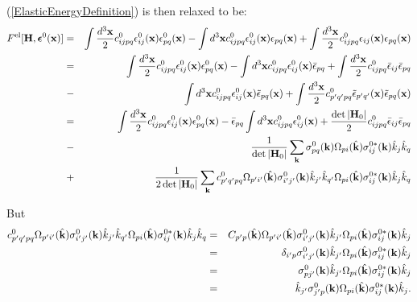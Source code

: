\documentclass[12pt]{article}
\def\bmath#1{\mbox{\boldmath$#1$}}
\begin{document}
(\ref{ElasticEnergyDefinition}) is then relaxed to be:
\begin{eqnarray}
F^{\rm el}[{\bf H}, \bmath{\epsilon}^0({\bf x})] =&& 
 \int \frac{d^3{\bf x}}{2} c^0_{ijpq}
 \epsilon^0_{ij}({\bf x})  
 \epsilon^0_{pq}({\bf x}) - 
\int d^3{\bf x} c^0_{ijpq} \epsilon^0_{ij}({\bf x}) {\epsilon}_{pq}({\bf x})
+ 
\int \frac{d^3{\bf x}}{2} c^0_{ijpq} 
{\epsilon}_{ij}({\bf x}){\epsilon}_{pq}({\bf x})
 \nonumber\\
=&& 
 \int \frac{d^3{\bf x}}{2} c^0_{ijpq}
 \epsilon^0_{ij}({\bf x})  
 \epsilon^0_{pq}({\bf x}) - 
\int d^3{\bf x} c^0_{ijpq} \epsilon^0_{ij}({\bf x}) \bar{\epsilon}_{pq}
+ 
\int \frac{d^3{\bf x}}{2} c^0_{ijpq} \bar{\epsilon}_{ij} \bar{\epsilon}_{pq}
 \nonumber\\
-&& \int d^3{\bf x} c^0_{ijpq} \epsilon^0_{ij}({\bf x})
  \tilde{\epsilon}_{pq}({\bf x}) + 
\int \frac{d^3{\bf x}}{2} c^0_{p'q'pq} \tilde{\epsilon}_{p'q'}({\bf x}) 
\tilde{\epsilon}_{pq}({\bf x}) 
\nonumber\\
=&& 
 \int \frac{d^3{\bf x}}{2} c^0_{ijpq}
 \epsilon^0_{ij}({\bf x})  
 \epsilon^0_{pq}({\bf x}) - 
\bar{\epsilon}_{pq}\int d^3{\bf x} c^0_{ijpq} \epsilon^0_{ij}({\bf x}) 
+ 
\frac{\det|{\bf H}_0|}{2} c^0_{ijpq} \bar{\epsilon}_{ij} \bar{\epsilon}_{pq}
 \nonumber\\
-&& \frac{1}{\det|{\bf H}_0|}\sum_{\bf k}
\sigma^0_{pq}({\bf k})
\Omega_{pi}(\hat{\bf k})\sigma^{0*}_{ij}({\bf k}) \hat{k}_j \hat{k}_q
 \nonumber\\
 +&&
\frac{1}{2\det|{\bf H}_0|}\sum_{\bf k}
c^0_{p'q'pq} 
\Omega_{p'i'}(\hat{\bf k})\sigma^0_{i'j'}({\bf k}) \hat{k}_{j'} \hat{k}_{q'} 
\Omega_{pi}(\hat{\bf k})\sigma^{0*}_{ij}({\bf k}) \hat{k}_j \hat{k}_q 
\end{eqnarray}

But 
\begin{eqnarray}
c^0_{p'q'pq} 
\Omega_{p'i'}(\hat{\bf k})\sigma^0_{i'j'}({\bf k}) \hat{k}_{j'} \hat{k}_{q'} 
\Omega_{pi}(\hat{\bf k})\sigma^{0*}_{ij}({\bf k}) \hat{k}_j \hat{k}_q
=&& 
 C_{p'p}(\hat{\bf k})\Omega_{p'i'}(\hat{\bf k})\sigma^0_{i'j'}({\bf k}) \hat{k}_{j'}\Omega_{pi}(\hat{\bf k})\sigma^{0*}_{ij}({\bf k}) \hat{k}_j
\nonumber\\ =&& 
 \delta_{i'p} \sigma^0_{i'j'}({\bf k}) \hat{k}_{j'}\Omega_{pi}(\hat{\bf k})\sigma^{0*}_{ij}({\bf k}) \hat{k}_j
\nonumber\\ =&& 
  \sigma^0_{pj'}({\bf k}) \hat{k}_{j'}\Omega_{pi}(\hat{\bf k})\sigma^{0*}_{ij}({\bf k}) \hat{k}_j
\nonumber\\ =&& 
  \hat{k}_{j'} \sigma^0_{j'p}({\bf k}) \Omega_{pi}(\hat{\bf k})\sigma^{0*}_{ij}({\bf k}) \hat{k}_j.
\end{eqnarray}
\end{document}
